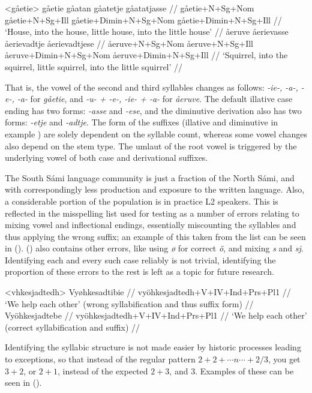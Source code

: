 \documentclass{flammie}
\begin{document}
\pex<gåetie>
\a
\begingl
\gla gåetie gåatan gåatetje gåatatjasse //
\glb gåetie+N+Sg+Nom gåetie+N+Sg+Ill gåetie+Dimin+N+Sg+Nom gåetie+Dimin+N+Sg+Ill //
\glft `House, into the house, little house, into the little house' //
\endgl
\a
\begingl
\gla åeruve åerievasse åerievadtje åerievadtjese //
\glb åeruve+N+Sg+Nom åeruve+N+Sg+Ill åeruve+Dimin+N+Sg+Nom åeruve+Dimin+N+Sg+Ill //
\glft `Squirrel, into the squirrel, little squirrel, into the little squirrel' //
\endgl
\xe

That is, the vowel of the second and third syllables changes as follows:
\textit{-ie-, -a-, -e-, -a-} for \textit{gåetie}, and \textit{-u- + -e-, -ie- +
-a-} for \textit{åeruve}. The default illative case ending has two forms:
\textit{-asse} and \textit{-ese}, and the diminutive derivation also has two
forms: \textit{-etje} and \textit{-adtje}. The form of the suffixes (illative
and diminutive in example ) are solely dependent on the syllable
count, whereas some vowel changes also depend on the stem type. The umlaut of
the root vowel is triggered by the underlying vowel of both case and
derivational suffixes.

The South Sámi language community is just a fraction of the North Sámi, and with
correspondingly less production and exposure to the written language. Also, a
considerable portion of the population is in practice L2 speakers. This is
reflected in the misspelling list used for testing as a number of errors
relating to mixing vowel and inflectional endings, essentially miscounting the
syllables and thus applying the wrong suffix; an example of this taken from the
list can be seen in (\nextx). (\nextx) also contains other errors, like using
\textit{ø} for correct \textit{ö}, and mixing \textit{s} and \textit{sj}.
Identifying each and every such case reliably is not trivial, identifying the
proportion of these errors to the rest is left as a topic for future research.

\pex<vhkesjadtedh>
\a
\begingl
\gla *Vyøhkesadtibie //
\glb vyöhkesjadtedh+V+IV+Ind+Prs+Pl1 //
\glft `We help each other' (wrong syllabification and thus suffix form) //
\endgl
\a
\begingl
\gla Vyöhkesjadtebe //
\glb vyöhkesjadtedh+V+IV+Ind+Prs+Pl1 //
\glft `We help each other' (correct syllabification and suffix) //
\endgl
\xe

Identifying the syllabic structure is not made easier by historic processes
leading to exceptions, so that instead of the regular pattern $2+2+\cdots
n\cdots +2/3$, you get $3+2$, or $2+1$, instead of the expected $2+3$, and $3$.
Examples of these can be seen in (\nextx).
\end{document}
